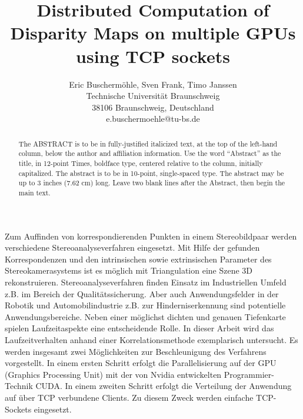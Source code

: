 \documentclass[times, 10pt,twocolumn]{article}
\begin{document}
\title{Distributed Computation of Disparity Maps on multiple GPUs using TCP sockets}

\author{Eric Buschermöhle, Sven Frank, Timo Janssen\\
Technische Universität Braunschweig \\  38106 Braunschweig, Deutschland\\
e.buschermoehle@tu-bs.de\\
}


\maketitle
\thispagestyle{empty}

\begin{abstract}
   The ABSTRACT is to be in fully-justified italicized text, at the top 
   of the left-hand column, below the author and affiliation 
   information. Use the word ``Abstract'' as the title, in 12-point 
   Times, boldface type, centered relative to the column, initially 
   capitalized. The abstract is to be in 10-point, single-spaced type. 
   The abstract may be up to 3 inches (7.62 cm) long. Leave two blank 
   lines after the Abstract, then begin the main text. 
\end{abstract}




Zum Auffinden von korrespondierenden Punkten in einem Stereobildpaar werden verschiedene Stereoanalyseverfahren eingesetzt. Mit Hilfe der gefunden Korrespondenzen und den intrinsischen sowie extrinsischen Parameter des Stereokamerasystems ist es möglich mit Triangulation eine Szene 3D rekonstruieren. Stereoanalyseverfahren finden Einsatz im Industriellen Umfeld z.B. im Bereich der Qualitätssicherung. Aber auch Anwendungsfelder in der Robotik und Automobilindustrie z.B. zur Hinderniserkennung  sind potentielle Anwendungsbereiche. Neben einer möglichst dichten und genauen Tiefenkarte spielen Laufzeitaspekte eine entscheidende Rolle. In dieser Arbeit wird das Laufzeitverhalten anhand einer Korrelationsmethode exemplarisch untersucht. Es werden insgesamt zwei Möglichkeiten zur Beschleunigung des Verfahrens vorgestellt. In einem ersten Schritt erfolgt die Parallelisierung auf der GPU (Graphics Processing Unit) mit der von Nvidia entwickelten Programmier-Technik CUDA. In einem zweiten Schritt erfolgt die Verteilung der Anwendung auf über TCP verbundene Clients. Zu diesem Zweck werden einfache TCP-Sockets eingesetzt. {\color{red}{Quelle}}
\end{document}
